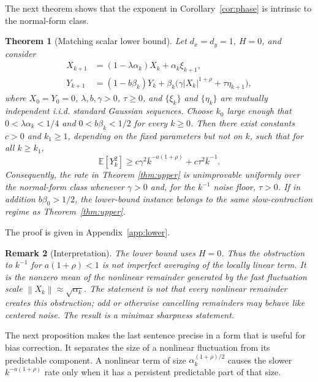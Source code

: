 \documentclass{article}
\newtheorem{theorem}{Theorem}[section]
\newtheorem{remark}[theorem]{Remark}
\newcommand{\E}{\mathbb{E}}
\newcommand{\norm}[1]{\left\lVert #1\right\rVert}
\begin{document}
The next theorem shows that the exponent in Corollary~\ref{cor:phase} is intrinsic to the normal-form class.

\begin{theorem}[Matching scalar lower bound]\label{thm:lower}
Let $d_x=d_y=1$, $H=0$, and consider
\begin{align}
  X_{k+1} &= (1-\lambda\alpha_k)X_k+\alpha_k\xi_{k+1}, \label{eq:lower-fast}\\
  Y_{k+1} &= (1-b\beta_k)Y_k+\beta_k\big(\gamma |X_k|^{1+\rho}+\tau\eta_{k+1}\big), \label{eq:lower-slow}
\end{align}
where $X_0=Y_0=0$, $\lambda,b,\gamma>0$, $\tau\ge0$, and $\{\xi_k\}$ and $\{\eta_k\}$ are mutually independent i.i.d. standard Gaussian sequences. Choose $k_0$ large enough that $0<\lambda\alpha_k<1/4$ and $0<b\beta_k<1/2$ for every $k\ge0$. Then there exist constants $c>0$ and $k_1\ge1$, depending on the fixed parameters but not on $k$, such that for all $k\ge k_1$,
\begin{equation}
  \E[Y_k^2]\ge c\gamma^2\bar k^{-a(1+\rho)}+c\tau^2\bar k^{-1}. \label{eq:lower-bound}
\end{equation}
Consequently, the rate in Theorem \ref{thm:upper} is unimprovable uniformly over the normal-form class whenever $\gamma>0$ and, for the $k^{-1}$ noise floor, $\tau>0$. If in addition $b\beta_0>1/2$, the lower-bound instance belongs to the same slow-contraction regime as Theorem~\ref{thm:upper}.
\end{theorem}

The proof is given in Appendix~\ref{app:lower}.

\begin{remark}[Interpretation]
The lower bound uses $H=0$. Thus the obstruction to $k^{-1}$ for $a(1+\rho)<1$ is not imperfect averaging of the locally linear term. It is the nonzero mean of the nonlinear remainder generated by the fast fluctuation scale $\norm{X_k}\approx\sqrt{\alpha_k}$. The statement is not that every nonlinear remainder creates this obstruction; odd or otherwise cancelling remainders may behave like centered noise. The result is a minimax sharpness statement.
\end{remark}

The next proposition makes the last sentence precise in a form that is useful for bias correction. It separates the size of a nonlinear fluctuation from its predictable component. A nonlinear term of size $\alpha_k^{(1+\rho)/2}$ causes the slower $k^{-a(1+\rho)}$ rate only when it has a persistent predictable part of that size.
\end{document}
